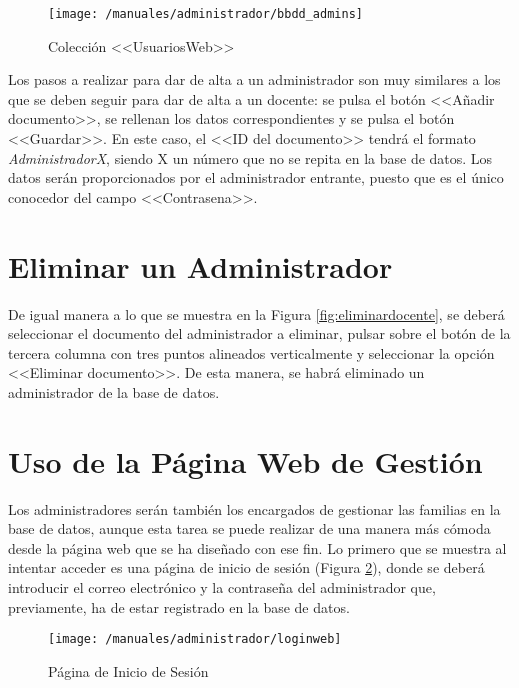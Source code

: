 \begin{figure}[!h]
	\begin{center}
		\texttt{[image: /manuales/administrador/bbdd\_admins]}
		\caption{Colección <<UsuariosWeb>>}
		\label{fig:bbdduweb}
	\end{center}
\end{figure}

Los pasos a realizar para dar de alta a un administrador son muy similares a los que se deben seguir para dar de alta a un docente: se pulsa el botón <<Añadir documento>>, se rellenan los datos correspondientes y se pulsa el botón <<Guardar>>. En este caso, el <<ID del documento>> tendrá el formato \mbox{\textit{AdministradorX}}, siendo X un número que no se repita en la base de datos. Los datos serán proporcionados por el administrador entrante, puesto que es el único conocedor del campo <<Contrasena>>.

\section*{Eliminar un Administrador}
De igual manera a lo que se muestra en la Figura \ref{fig:eliminardocente}, se deberá seleccionar el documento del administrador a eliminar, pulsar sobre el botón de la tercera columna con tres puntos alineados verticalmente y seleccionar la opción <<Eliminar documento>>. De esta manera, se habrá eliminado un administrador de la base de datos.

\clearpage

\section*{Uso de la Página Web de Gestión}
Los administradores serán también los encargados de gestionar las familias en la base de datos, aunque esta tarea se puede realizar de una manera más cómoda desde la página web que se ha diseñado con ese fin. Lo primero que se muestra al intentar acceder es una página de inicio de sesión (Figura \ref{fig:loginweb}), donde se deberá introducir el correo electrónico y la contraseña del administrador que, previamente, ha de estar registrado en la base de datos.

\begin{figure}[!h]
	\begin{center}
		\texttt{[image: /manuales/administrador/loginweb]}
		\caption{Página de Inicio de Sesión}
		\label{fig:loginweb}
	\end{center}
\end{figure}

